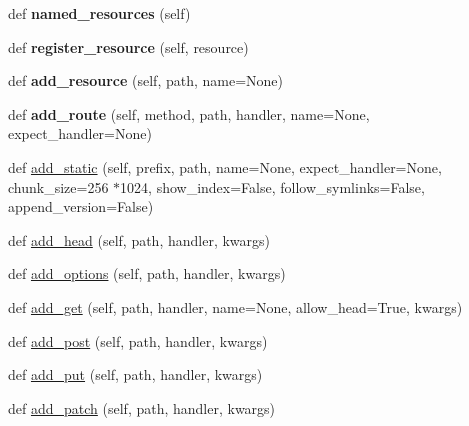 \begin{DoxyCompactItemize}
def {\bfseries named\+\_\+resources} (self)
\item 
\mbox{\label{classaiohttp_1_1web__urldispatcher_1_1_url_dispatcher_a603ef3499bd5d728c75a576d9d7e5cdc}} 
def {\bfseries register\+\_\+resource} (self, resource)
\item 
\mbox{\label{classaiohttp_1_1web__urldispatcher_1_1_url_dispatcher_af0b5574b77cbaf41af756b39d2283bb7}} 
def {\bfseries add\+\_\+resource} (self, path, name=None)
\item 
\mbox{\label{classaiohttp_1_1web__urldispatcher_1_1_url_dispatcher_a4aa429a2b1e792e521c436feea911c68}} 
def {\bfseries add\+\_\+route} (self, method, path, handler, name=None, expect\+\_\+handler=None)
\item 
def \hyperlink{classaiohttp_1_1web__urldispatcher_1_1_url_dispatcher_a51881bea91cd64ead8bd9717ba0b96ed}{add\+\_\+static} (self, prefix, path, name=None, expect\+\_\+handler=None, chunk\+\_\+size=256 $\ast$1024, show\+\_\+index=False, follow\+\_\+symlinks=False, append\+\_\+version=False)
\item 
def \hyperlink{classaiohttp_1_1web__urldispatcher_1_1_url_dispatcher_a41bfa58768e2eaa444f528e299f9a492}{add\+\_\+head} (self, path, handler, kwargs)
\item 
def \hyperlink{classaiohttp_1_1web__urldispatcher_1_1_url_dispatcher_aa9593de4416fde65adfb837d9ef065b0}{add\+\_\+options} (self, path, handler, kwargs)
\item 
def \hyperlink{classaiohttp_1_1web__urldispatcher_1_1_url_dispatcher_abf5734aafaab163d20b158b6ecdc8d30}{add\+\_\+get} (self, path, handler, name=None, allow\+\_\+head=True, kwargs)
\item 
def \hyperlink{classaiohttp_1_1web__urldispatcher_1_1_url_dispatcher_a92d640428f9b884450075b2495f75812}{add\+\_\+post} (self, path, handler, kwargs)
\item 
def \hyperlink{classaiohttp_1_1web__urldispatcher_1_1_url_dispatcher_a9a7a70995b6863953d4d185abc9d3354}{add\+\_\+put} (self, path, handler, kwargs)
\item 
def \hyperlink{classaiohttp_1_1web__urldispatcher_1_1_url_dispatcher_ade00fe669cb2cdb2c837738d249f2728}{add\+\_\+patch} (self, path, handler, kwargs)
\item 

\end{DoxyCompactItemize}
